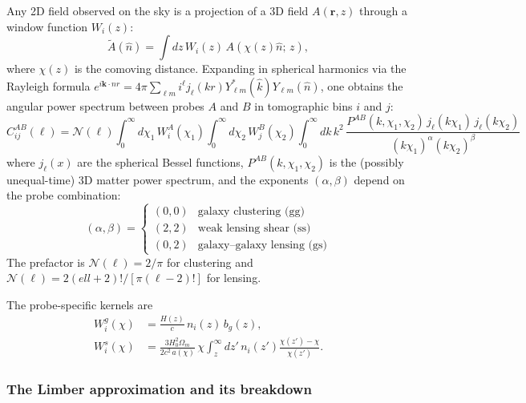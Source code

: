 Any 2D field observed on the sky is a projection of a 3D field
$A(\mathbf{r}, z)$ through a window function $W_i(z)$:
\begin{equation}
    \tilde{A}(\hat{n}) = \int dz\, W_i(z)\, A(\chi(z)\hat{n};\, z),
\end{equation}
where $\chi(z)$ is the comoving distance. Expanding in spherical
harmonics via the Rayleigh formula $e^{i\mathbf{k}\cdot\hat{n}r} =
4\pi\sum_{\ell m}i^\ell j_\ell(kr)Y^*_{\ell m}(\hat{k})Y_{\ell m}(\hat{n})$,
one obtains the angular power spectrum between probes $A$ and $B$ in
tomographic bins $i$ and $j$:
\begin{equation}
    \boxed{
    C_{ij}^{AB}(\ell) = \mathcal{N}(\ell)
    \int_0^\infty d\chi_1\, W_i^A(\chi_1)
    \int_0^\infty d\chi_2\, W_j^B(\chi_2)
    \int_0^\infty dk\, k^2\,
    \frac{P^{AB}(k,\chi_1,\chi_2)\,j_\ell(k\chi_1)\,j_\ell(k\chi_2)}
         {(k\chi_1)^\alpha (k\chi_2)^\beta}
    }
    \label{eq:blast_cij}
\end{equation}
where $j_\ell(x)$ are the spherical Bessel functions,
$P^{AB}(k,\chi_1,\chi_2)$ is the (possibly unequal-time) 3D matter
power spectrum, and the exponents $(\alpha,\beta)$ depend on the probe
combination:
\begin{equation}
    (\alpha, \beta) =
    \begin{cases}
        (0,0) & \text{galaxy clustering (gg)}\\
        (2,2) & \text{weak lensing shear (ss)}\\
        (0,2) & \text{galaxy--galaxy lensing (gs)}
    \end{cases}
\end{equation}
The prefactor is $\mathcal{N}(\ell) = 2/\pi$ for clustering and
$\mathcal{N}(\ell) = 2(ell+2)!/[\pi(\ell-2)!]$ for lensing.

The probe-specific kernels are
\begin{align}
    W_i^g(\chi) &= \frac{H(z)}{c}\,n_i(z)\,b_g(z), \\
    W_i^s(\chi) &= \frac{3H_0^2\Omega_m}{2c^2\,a(\chi)}\,\chi
                   \int_z^\infty dz'\,n_i(z')
                   \frac{\chi(z')-\chi}{\chi(z')}.
\end{align}

\subsubsection{The Limber approximation and its breakdown}

